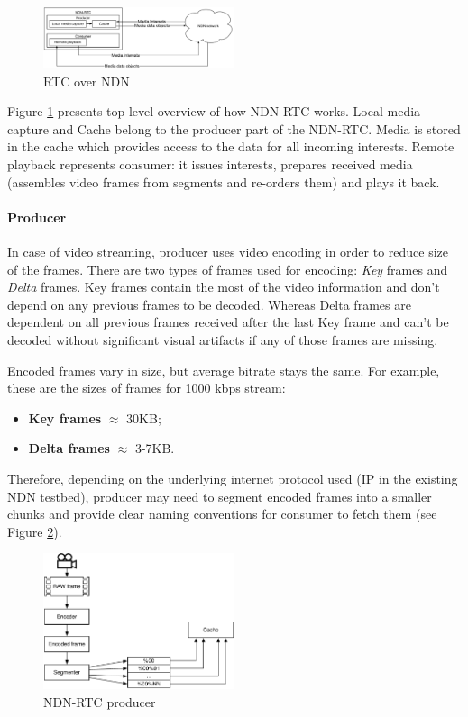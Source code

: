 \documentclass[10pt]{proc}
\begin{document}
\begin{figure}[Ht!]
\centering
\includegraphics[width=0.5\textwidth]{architecture}
\caption{RTC over NDN}
\label{fig:arc}
\end{figure}

Figure \ref{fig:arc} presents top-level overview of how NDN-RTC works. Local media capture and Cache belong to the producer part of the NDN-RTC. Media is stored in the cache which provides access to the data for all incoming interests. Remote playback represents consumer: it issues interests, prepares received media (assembles video frames from segments and re-orders them) and plays it back.

\paragraph{Producer}

In case of video streaming, producer uses video encoding in order to reduce size of the frames. There are two types of frames used for encoding: \textit{Key} frames and \textit{Delta} frames. Key frames contain the most of the video information and don't depend on any previous frames to be decoded. Whereas Delta frames are dependent on all previous frames received after the last Key frame and can't be decoded without significant visual artifacts if any of those frames are missing.

Encoded frames vary in size, but average bitrate stays the same. For example, these are the sizes of frames for 1000 kbps stream:
\begin{itemize}
\item \textbf{Key frames} $\approx$ 30KB;
\item \textbf{Delta frames} $\approx$ 3-7KB.
\end{itemize}

Therefore, depending on the underlying internet protocol used (IP in the existing NDN testbed), producer may need to segment encoded frames into a smaller chunks and provide clear naming conventions for consumer to fetch them (see Figure \ref{fig:producer}).

\begin{figure}[Ht!]
\centering
\includegraphics[width=0.5\textwidth]{producer}
\caption{NDN-RTC producer}
\label{fig:producer}
\end{figure}
\end{document}
